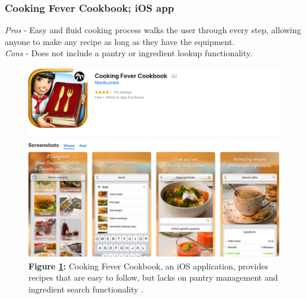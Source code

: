 \documentclass{sigchi}
\begin{document}
	\subsubsection{\textbf{Cooking Fever Cookbook}; iOS app}
		\textit{Pros} - Easy and fluid cooking process walks the user through every step, allowing anyone to make any recipe as long as they have the equipment.\\
		\textit{Cons} - Does not include a pantry or ingredient lookup functionality.
		\begin{figure}[htb!]
		\centering
			\includegraphics[width=0.8\columnwidth]{cfc.png}\\
			\textbf{Figure \ref{fig:cfc}:} Cooking Fever Cookbook, an iOS application, provides recipes that are easy to follow, but lacks on pantry management and ingredient search functionality \cite{cookingfever}.
			\label{fig:cfc}
		\end{figure}
\end{document}
